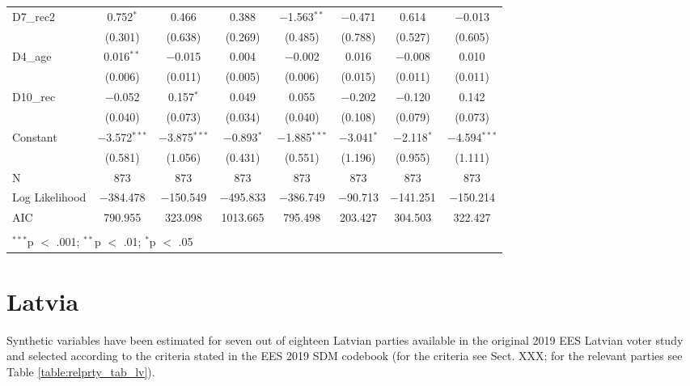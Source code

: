 \documentclass[
]{article}
\begin{document}
\begin{table}[!htbp]
\begin{tabular}{@{\extracolsep{5pt}}lccccccc}
  D7\_rec2 & 0.752$^{*}$ & 0.466 & 0.388 & $-$1.563$^{**}$ & $-$0.471 & 0.614 & $-$0.013 \\ 
  & (0.301) & (0.638) & (0.269) & (0.485) & (0.788) & (0.527) & (0.605) \\ 
  D4\_age & 0.016$^{**}$ & $-$0.015 & 0.004 & $-$0.002 & 0.016 & $-$0.008 & 0.010 \\ 
  & (0.006) & (0.011) & (0.005) & (0.006) & (0.015) & (0.011) & (0.011) \\ 
  D10\_rec & $-$0.052 & 0.157$^{*}$ & 0.049 & 0.055 & $-$0.202 & $-$0.120 & 0.142 \\ 
  & (0.040) & (0.073) & (0.034) & (0.040) & (0.108) & (0.079) & (0.073) \\ 
  Constant & $-$3.572$^{***}$ & $-$3.875$^{***}$ & $-$0.893$^{*}$ & $-$1.885$^{***}$ & $-$3.041$^{*}$ & $-$2.118$^{*}$ & $-$4.594$^{***}$ \\ 
  & (0.581) & (1.056) & (0.431) & (0.551) & (1.196) & (0.955) & (1.111) \\ 
 N & 873 & 873 & 873 & 873 & 873 & 873 & 873 \\ 
Log Likelihood & $-$384.478 & $-$150.549 & $-$495.833 & $-$386.749 & $-$90.713 & $-$141.251 & $-$150.214 \\ 
AIC & 790.955 & 323.098 & 1013.665 & 795.498 & 203.427 & 304.503 & 322.427 \\ 
\hline \\[-1.8ex] 
\multicolumn{8}{l}{$^{***}$p $<$ .001; $^{**}$p $<$ .01; $^{*}$p $<$ .05} \\ 
\end{tabular} 
\end{table}

\clearpage

\newpage

\hypertarget{latvia}{%
\section{Latvia}\label{latvia}}

Synthetic variables have been estimated for seven out of eighteen Latvian parties available in the original
2019 EES Latvian voter study and selected according to the criteria stated in the EES 2019 SDM codebook (for the criteria see Sect. XXX; for the relevant parties see Table \ref{table:relprty_tab_lv}).
\end{document}
